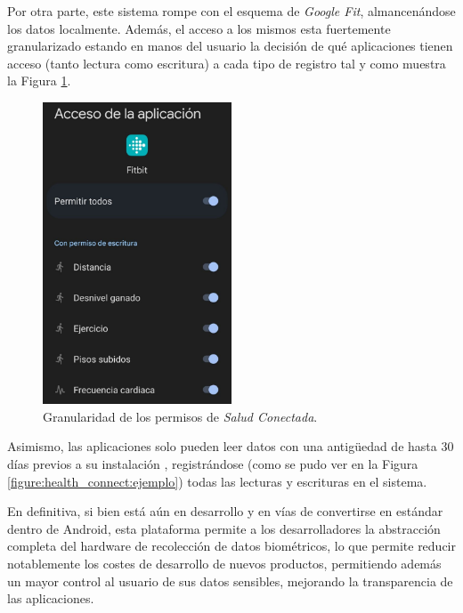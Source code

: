         Por otra parte, este sistema rompe con el esquema de \textit{Google Fit}, almancenándose los datos localmente. Además, el acceso a los mismos esta fuertemente granularizado estando en manos del usuario la decisión de qué aplicaciones tienen acceso (tanto lectura como escritura) a cada tipo de registro \cite{saez_google_2022} tal y como muestra la Figura \ref{figure:health_connect:granularidad_permisos}. 

        \begin{figure}[h]
            \centering
            \includegraphics[width=0.5\textwidth]{figures/Health connect permisos fitbit.jpg}
            \caption[Granularidad de los permisos de \textit{Salud Conectada}]
            {Granularidad de los permisos de \textit{Salud Conectada}.}
            \label{figure:health_connect:granularidad_permisos}
        \end{figure}

        
        Asimismo, las aplicaciones solo pueden leer datos con una antigüedad de hasta 30 días previos a su instalación \cite{android_developers_preguntas_nodate}, registrándose (como se pudo ver en la Figura \ref{figure:health_connect:ejemplo}) todas las lecturas y escrituras en el sistema.

        En definitiva, si bien está aún en desarrollo y en vías de convertirse en estándar dentro de Android, esta plataforma permite a los desarrolladores la abstracción completa del hardware de recolección de datos biométricos, lo que permite reducir notablemente los costes de desarrollo de nuevos productos, permitiendo además un mayor control al usuario de sus datos sensibles, mejorando la transparencia de las aplicaciones.

